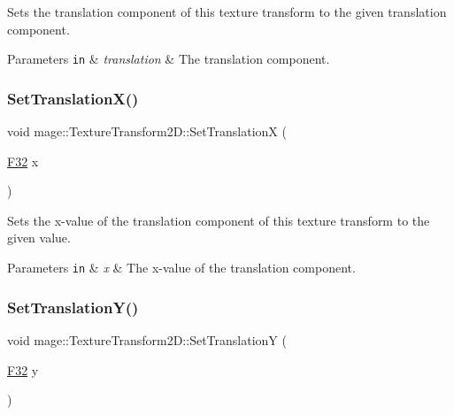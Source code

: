 Sets the translation component of this texture transform to the given translation component.


\begin{DoxyParams}[1]{Parameters}
\mbox{\tt in}  & {\em translation} & The translation component. \\
\hline
\end{DoxyParams}
\mbox{\label{classmage_1_1_texture_transform2_d_a048b06918c96b0a36e68da06728c5a03}} 
\subsubsection{\texorpdfstring{Set\+Translation\+X()}{SetTranslationX()}}
{\footnotesize\ttfamily void mage\+::\+Texture\+Transform2\+D\+::\+Set\+TranslationX (\begin{DoxyParamCaption}\item[{\mbox{\hyperlink{namespacemage_aa97e833b45f06d60a0a9c4fc22ae02c0}{F32}}}]{x }\end{DoxyParamCaption})\hspace{0.3cm}{\ttfamily [noexcept]}}

Sets the x-\/value of the translation component of this texture transform to the given value.


\begin{DoxyParams}[1]{Parameters}
\mbox{\tt in}  & {\em x} & The x-\/value of the translation component. \\
\hline
\end{DoxyParams}
\mbox{\label{classmage_1_1_texture_transform2_d_a8d4920dcc0b3d03a8dc09ba7a472a6d9}} 
\subsubsection{\texorpdfstring{Set\+Translation\+Y()}{SetTranslationY()}}
{\footnotesize\ttfamily void mage\+::\+Texture\+Transform2\+D\+::\+Set\+TranslationY (\begin{DoxyParamCaption}\item[{\mbox{\hyperlink{namespacemage_aa97e833b45f06d60a0a9c4fc22ae02c0}{F32}}}]{y }\end{DoxyParamCaption})\hspace{0.3cm}{\ttfamily [noexcept]}}

